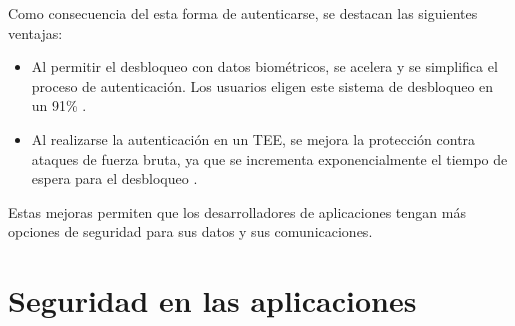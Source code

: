 Como consecuencia del esta forma de autenticarse, se destacan las siguientes ventajas:
\begin{itemize}
    \item Al permitir el desbloqueo con datos biométricos, se acelera y se simplifica el proceso de autenticación. Los usuarios eligen este sistema de desbloqueo en un 91\% \cite{asreview2015}.
    \item Al realizarse la autenticación en un TEE, se mejora la protección contra ataques de fuerza bruta, ya que se incrementa exponencialmente el tiempo de espera para el desbloqueo \cite{asreview2015}.
\end{itemize}
Estas mejoras permiten que los desarrolladores de aplicaciones tengan más opciones de seguridad para sus datos y sus comunicaciones.
\section{Seguridad en las aplicaciones}
